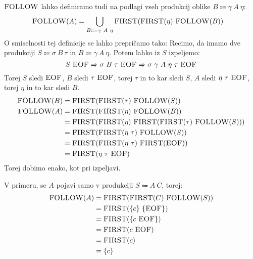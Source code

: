 \documentclass{article}
\newcommand{\FIRST}{\textsc{FIRST}}
\newcommand{\FOLLOW}{\textsc{FOLLOW}}
\newcommand{\EOF}{\textsc{EOF}}
\newcommand{\Arrow}{\Coloneqq}
\newcommand{\Derive}{\Rightarrow}
\newcommand{\Seq}{\ }
\begin{document}
$\FOLLOW$ lahko definiramo tudi na podlagi vseh produkcij oblike ${B \Arrow \gamma \Seq A \Seq \eta}$:
\begin{align*}
  \FOLLOW(A) &= \bigcup_{B \Arrow \gamma \Seq A \Seq \eta} \FIRST(\FIRST(\eta) \Seq \FOLLOW(B))
\end{align*}
O smiselnosti tej definicije se lahko prepričamo tako:
Recimo, da imamo dve produkciji $S \Arrow \sigma \Seq B \Seq \tau$ in $B \Arrow \gamma \Seq A \Seq \eta$.
Potem lahko iz $S$ izpeljemo:
\begin{equation*}
  S \Seq \EOF \Derive \sigma \Seq B \Seq \tau \Seq \EOF \Derive \sigma \Seq \gamma \Seq A \Seq \eta \Seq \tau \Seq \EOF
\end{equation*}
Torej $S$ sledi $\EOF$, $B$ sledi $\tau \Seq \EOF$, torej $\tau$ in to kar sledi $S$, $A$ sledi $\eta \Seq \tau \Seq \EOF$, torej $\eta$ in to kar sledi $B$.
\begin{align*}
  \FOLLOW(B) &= \FIRST(\FIRST(\tau) \Seq \FOLLOW(S))\\
  \FOLLOW(A) &= \FIRST(\FIRST(\eta) \Seq \FOLLOW(B))\\
   &= \FIRST(\FIRST(\eta) \Seq \FIRST(\FIRST(\tau) \Seq \FOLLOW(S)))\\
   &= \FIRST(\FIRST(\eta \Seq \tau) \Seq \FOLLOW(S))\\
   &= \FIRST(\FIRST(\eta \Seq \tau) \Seq \FIRST(\EOF))\\
   &= \FIRST(\eta \Seq \tau \Seq \EOF)
\end{align*}
Torej dobimo enako, kot pri izpeljavi.

V primeru, se $A$ pojavi samo v produkciji $S \Arrow A \Seq C$, torej:
\begin{align*}
  \FOLLOW(A) &= \FIRST(\FIRST(C) \Seq \FOLLOW(S)) \\
             &= \FIRST(\{c\} \Seq \{\EOF\})\\
             &= \FIRST(\{c \Seq \EOF\})\\
             &= \FIRST(c \Seq \EOF) \\
             &= \FIRST(c) \\
             &= \{c\}
\end{align*}
\end{document}
